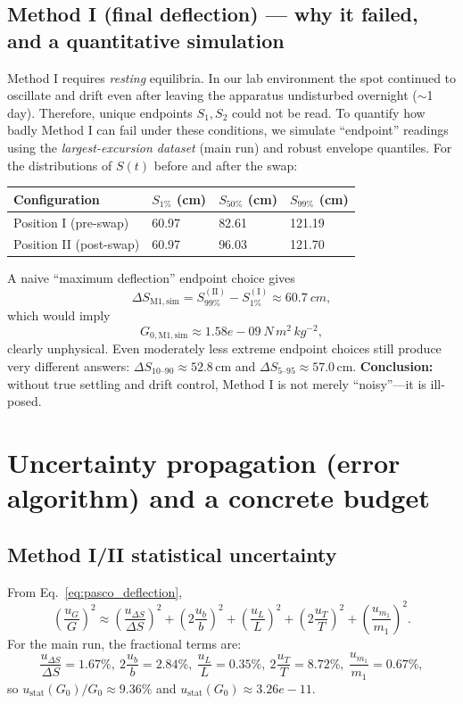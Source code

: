 \documentclass[11pt]{article}
\begin{document}
\subsection{Method I (final deflection) --- why it failed, and a quantitative simulation}
Method I requires \emph{resting} equilibria.
In our lab environment the spot continued to oscillate and drift even after leaving the apparatus undisturbed overnight ($\sim$1 day).
Therefore, unique endpoints $S_1,S_2$ could not be read.
To quantify how badly Method I can fail under these conditions, we simulate ``endpoint'' readings using the \emph{largest-excursion dataset} (main run) and robust envelope quantiles.
For the distributions of $S(t)$ before and after the swap:
\begin{center}
\begin{tabular}{@{}llll@{}}
\toprule
Configuration & $S_{1\%}$ (cm) & $S_{50\%}$ (cm) & $S_{99\%}$ (cm) \\ \midrule
Position I (pre-swap) & 60.97 & 82.61 & 121.19 \\
Position II (post-swap) & 60.97 & 96.03 & 121.70 \\
\bottomrule
\end{tabular}
\end{center}
A naive ``maximum deflection'' endpoint choice gives
\[
\Delta S_{\mathrm{M1,sim}} = S_{99\%}^{(\mathrm{II})}-S_{1\%}^{(\mathrm{I})} \approx 60.7\ \si{cm},
\]
which would imply
\[
G_{0,\mathrm{M1,sim}} \approx 1.58e-09\ \si{N\,m^2\,kg^{-2}},
\]
clearly unphysical. Even moderately less extreme endpoint choices still produce very different answers:
$\Delta S_{10\text{--}90}\approx 52.8$\,cm and
$\Delta S_{5\text{--}95}\approx 57.0$\,cm.
\textbf{Conclusion:} without true settling and drift control, Method I is not merely ``noisy''---it is ill-posed.

\section{Uncertainty propagation (error algorithm) and a concrete budget}
\subsection*{Method I/II statistical uncertainty}
From Eq.~\eqref{eq:pasco_deflection},
\[
\left(\frac{u_G}{G}\right)^2 \approx 
\left(\frac{u_{\Delta S}}{\Delta S}\right)^2
+\left(2\frac{u_b}{b}\right)^2
+\left(\frac{u_L}{L}\right)^2
+\left(2\frac{u_T}{T}\right)^2
+\left(\frac{u_{m_1}}{m_1}\right)^2.
\]
For the main run, the fractional terms are:
\[
\frac{u_{\Delta S}}{\Delta S}=1.67\%,\ 
2\frac{u_b}{b}=2.84\%,\ 
\frac{u_L}{L}=0.35\%,\ 
2\frac{u_T}{T}=8.72\%,\ 
\frac{u_{m_1}}{m_1}=0.67\%,
\]
so $u_{\mathrm{stat}}(G_0)/G_0 \approx 9.36\%$ and $u_{\mathrm{stat}}(G_0)\approx 3.26e-11$.
\end{document}
